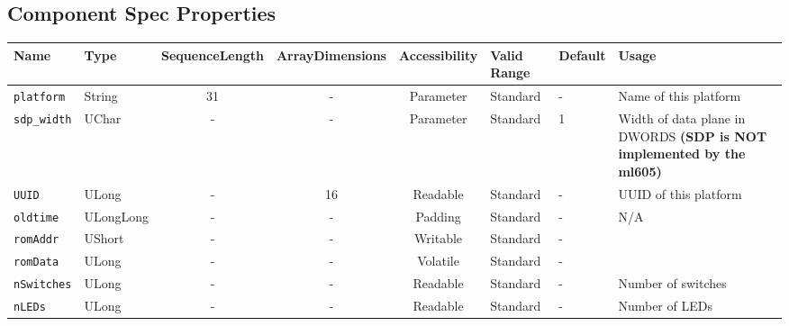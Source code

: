 \documentclass{article}
\begin{document}
\begin{landscape}
	\section*{Component Spec Properties}
	\begin{scriptsize}
		\begin{tabular}{|p{3cm}|p{1.5cm}|c|c|c|p{1.5cm}|p{1cm}|p{6cm}|}
			\hline
			\rowcolor{blue}
			Name               & Type   & SequenceLength & ArrayDimensions & Accessibility      & Valid Range & Default & Usage                                                                         \\
			\hline
			\verb+platform+    & String & 31             & -               & Parameter & Standard & - & Name of this platform                                                     \\
			\hline
			\verb+sdp_width+   & UChar  & -              & -               & Parameter & Standard & 1 & Width of data plane in DWORDS \newline \textbf{(SDP is NOT implemented by the ml605)}   \\
			\hline
			\verb+UUID+        & ULong  & -              & 16              & Readable           & Standard    & -       & UUID of this platform                                                         \\
			\hline
			\verb+oldtime+     & ULongLong & -           & -               & Padding            & Standard    & -       & N/A                                                                           \\
			\hline
			\verb+romAddr+     & UShort & -              & -               & Writable           & Standard    & -       &                                                                               \\
			\hline
			\verb+romData+     & ULong  & -              & -               & Volatile           & Standard    & -       &                                                                               \\
			\hline
			\verb+nSwitches+   & ULong  & -              & -               & Readable           & Standard    & -       & Number of switches                                                            \\
			\hline
			\verb+nLEDs+       & ULong  & -              & -               & Readable           & Standard    & -       & Number of LEDs                                                                \\

\end{tabular}
\end{scriptsize}
\end{landscape}
\end{document}
